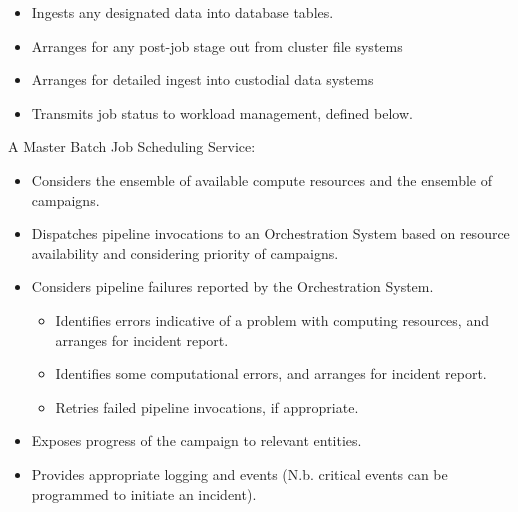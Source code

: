 \begin{itemize}
    \begin{itemize}

    \item Ingests any designated data into database tables.

    \item Arranges for any post-job stage out from cluster file systems

    \item Arranges for detailed ingest into custodial data systems

    \item Transmits job status to workload management, defined below.

    \end{itemize}

\end{itemize}

A Master Batch Job Scheduling Service:

\begin{itemize}

\item Considers the ensemble of available compute resources and the ensemble of 
campaigns.

\item Dispatches pipeline invocations to an Orchestration System based on 
resource availability and considering priority of campaigns.

\item Considers pipeline failures reported by the Orchestration System.

    \begin{itemize}

    \item Identifies errors indicative of a problem with computing resources, 
    and arranges for incident report.

    \item Identifies some computational errors, and arranges for incident report.

    \item Retries failed pipeline invocations, if appropriate.

    \end{itemize}

\item Exposes progress of the campaign to relevant entities.

\item Provides appropriate logging and events (N.b. critical events can be 
programmed to initiate an incident).

\end{itemize}

